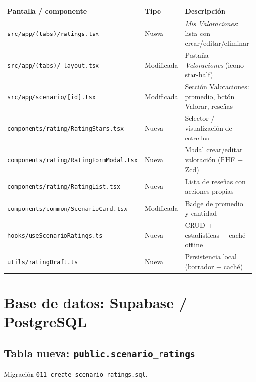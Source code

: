 \documentclass[11pt,a4paper]{article}
\begin{document}
\begin{center}
\begin{tabularx}{\textwidth}{@{}>{\raggedright\arraybackslash}X>{\raggedright\arraybackslash}p{2cm}>{\raggedright\arraybackslash}p{4.6cm}@{}}
\toprule
\textbf{Pantalla / componente} & \textbf{Tipo} & \textbf{Descripción}\\
\midrule
\texttt{src/app/(tabs)/ratings.tsx} & Nueva & \emph{Mis Valoraciones}: lista con crear/editar/eliminar\\
\texttt{src/app/(tabs)/\_layout.tsx} & Modificada & Pestaña \emph{Valoraciones} (icono star-half)\\
\texttt{src/app/scenario/[id].tsx} & Modificada & Sección Valoraciones: promedio, botón Valorar, reseñas\\
\texttt{components/rating/RatingStars.tsx} & Nueva & Selector / visualización de estrellas\\
\texttt{components/rating/RatingFormModal.tsx} & Nueva & Modal crear/editar valoración (RHF + Zod)\\
\texttt{components/rating/RatingList.tsx} & Nueva & Lista de reseñas con acciones propias\\
\texttt{components/common/ScenarioCard.tsx} & Modificada & Badge de promedio y cantidad\\
\texttt{hooks/useScenarioRatings.ts} & Nueva & CRUD + estadísticas + caché offline\\
\texttt{utils/ratingDraft.ts} & Nueva & Persistencia local (borrador + caché)\\
\bottomrule
\end{tabularx}
\end{center}

\section{Base de datos: Supabase / PostgreSQL}
\label{sec:bd}

\subsection{Tabla nueva: \texttt{public.scenario\_ratings}}
Migración \texttt{011\_create\_scenario\_ratings.sql}.
\end{document}
